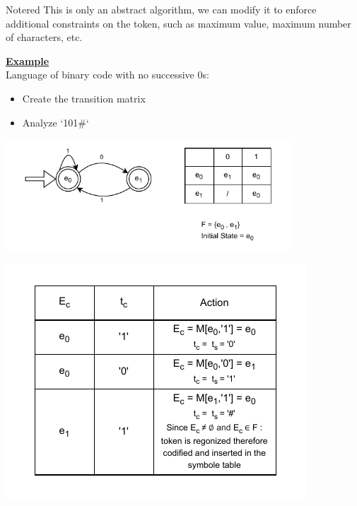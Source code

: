 \vspace{1cm}

\begin{prettyBox}{Note}{red}
This is only an abstract algorithm, we can modify it to enforce additional constraints on the token,  
such as maximum value, maximum number of characters, etc.  
\end{prettyBox}
\newpage

\textbf{\underline{Example}} \\[0.15cm]
Language of binary code with no successive 0s:
\begin{itemize}
    \item Create the transition matrix
    \item Analyze `101\#`
\end{itemize}

\begin{center}
    \includegraphics[width=0.8\textwidth]{Chapters/Examples/exalgo.drawio.pdf}
\end{center}

\vspace{0.5cm}

\begin{center}
    \includegraphics[height=0.5\textheight]{Chapters/Examples/exec.drawio.pdf}
\end{center}



